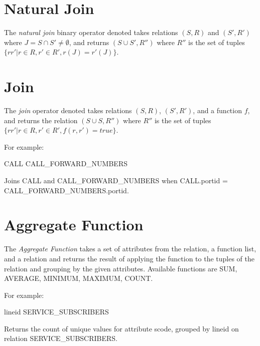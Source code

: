 \section{Natural Join}

The \emph{natural join} binary operator denoted \NaturalJoin takes
relations $(S,R)$ and $(S',R')$ where $J = S \cap S' \neq \emptyset$,
and returns $(S \cup S',R'')$ where $R''$ is the set of tuples $\{r r'
| r \in R, r' \in R', r(J) = r'(J) \}$.

\section{Join}

The \emph{join} operator denoted \Join{} takes relations $(S,R)$,
$(S',R')$, and a function $f$, and returns the relation $(S \cup
S,R'')$ where $R''$ is the set of tuples $\{ r r' | r \in R, r' \in
R', f(r,r') = true \}$.

For example:

CALL
CALL\_FORWARD\_NUMBERS

Joins CALL and CALL\_FORWARD\_NUMBERS when CALL.portid =
CALL\_FORWARD\_NUMBERS.portid.

\section{Aggregate Function}

The \emph{Aggregate Function} takes a set of attributes from the
relation, a function list, and a relation and returns the result of
applying the function to the tuples of the relation and grouping by
the given attributes.  Available functions are SUM, AVERAGE, MINIMUM,
MAXIMUM, COUNT.

For example:

lineid  SERVICE\_SUBSCRIBERS

Returns the count of unique values for attribute scode, grouped by
lineid on relation SERVICE\_SUBSCRIBERS.
